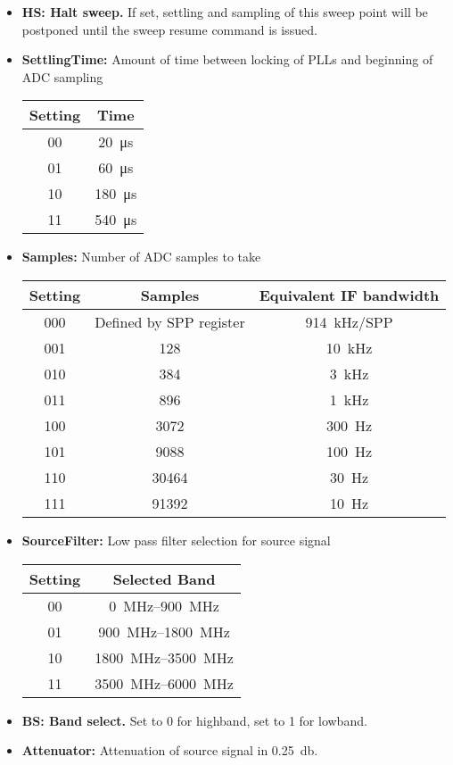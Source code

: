 \documentclass{article}
\begin{document}
\begin{itemize}
\item \textbf{HS: Halt sweep.} If set, settling and sampling of this sweep point will be postponed until the sweep resume command is issued.
\item \textbf{SettlingTime:} Amount of time between locking of PLLs and beginning of ADC sampling
\begin{center}
\begin{tabular}{ c|c }
Setting & Time\\
 \hline
00 & \SI{20}{\micro\second}\\
01 & \SI{60}{\micro\second}\\
10 & \SI{180}{\micro\second}\\
11 & \SI{540}{\micro\second}\\
\end{tabular}
\end{center}
\item \textbf{Samples:} Number of ADC samples to take
\begin{center}
\begin{tabular}{ c|c|c }
Setting & Samples & Equivalent IF bandwidth\\
 \hline
000 & Defined by SPP register & \SI{914}{\kilo\hertz}/SPP\\
001 & 128 & \SI{10}{\kilo\hertz}\\
010 & 384 & \SI{3}{\kilo\hertz}\\
011 & 896 & \SI{1}{\kilo\hertz}\\
100 & 3072 & \SI{300}{\hertz}\\
101 & 9088 & \SI{100}{\hertz}\\
110 & 30464 & \SI{30}{\hertz}\\
111 & 91392 & \SI{10}{\hertz}\\
\end{tabular}
\end{center}
\item \textbf{SourceFilter:} Low pass filter selection for source signal
\begin{center}
\begin{tabular}{ c|c }
Setting & Selected Band\\
 \hline
00 & \SIrange{0}{900}{\mega\hertz}\\
01 & \SIrange{900}{1800}{\mega\hertz}\\
10 & \SIrange{1800}{3500}{\mega\hertz}\\
11 & \SIrange{3500}{6000}{\mega\hertz}\\
\end{tabular}
\end{center}
\item \textbf{BS: Band select.} Set to 0 for highband, set to 1 for lowband.
\item \textbf{Attenuator:} Attenuation of source signal in \SI{0.25}{\decibel}.
\end{itemize}
\end{document}
